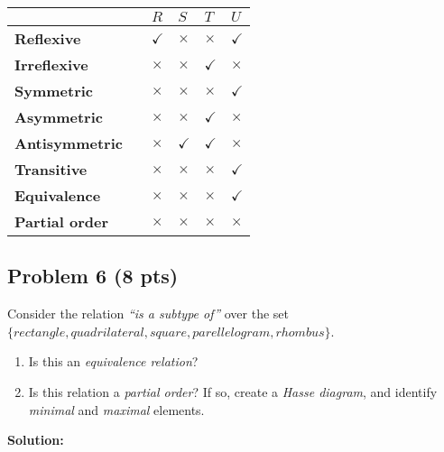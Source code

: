 \documentclass[12pt]{article}
\begin{document}
\begin{center}
\begin{tabular}{|l|l|l|l|l|l|}
\hline
						&	&	$R$	&	$S$	&	$T$	& $U$\\
\hline
\textbf{Reflexive} 	&	&	$\checkmark$ &	$\times$		&	$\times$ & $\checkmark$\\
\hline
\textbf{Irreflexive} 	&	&	$\times$ &	$\times$		&	$\checkmark$ &	$\times$	\\
\hline
\textbf{Symmetric} 	&	&	$\times$ &	$\times$ 	&	$\times$ &	$\checkmark$\\
\hline
\textbf{Asymmetric} 	&	&	$\times$ &	$\times$ 	&	$\checkmark$ &	$\times$\\
\hline
\textbf{Antisymmetric} &	&	$\times$ &	$\checkmark$	&	$\checkmark$ &	$\times$ \\
\hline
\textbf{Transitive} 	&	&	$\times$ &	$\times$ &	$\times$	&	$\checkmark$\\
\hline
\textbf{Equivalence} 	&	&	$\times$ &	$\times$ &	$\times$	&	$\checkmark$\\
\hline
\textbf{Partial order} 	&	&	$\times$ &	$\times$	&	$\times$	&	$\times$\\
\hline
\end{tabular}
\end{center}

\newpage

\subsection{Problem 6 (8 pts)}

\noindent Consider the relation \textit{``is a subtype of''} over the set \\
\indent \indent \indent $\{ rectangle, quadrilateral, square, parellelogram, rhombus\}$.

\begin{enumerate}

\item Is this an \textit{equivalence relation}?

\item Is this relation a \textit{partial order}? If so, create a \textit{Hasse diagram}, and identify \textit{minimal} and \textit{maximal} elements.

\end{enumerate}

\bigskip
\noindent \textbf{Solution:}
\end{document}
